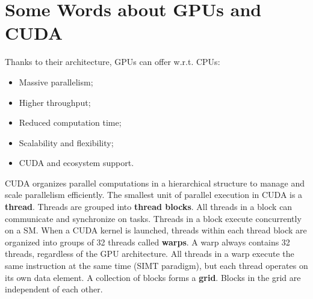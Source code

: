 \documentclass[conference]{IEEEtran}
\begin{document}
	\section{Some Words about GPUs and CUDA}
	Thanks to their architecture, GPUs can offer w.r.t. CPUs\cite{gpu101_lecture1}:
	\begin{itemize}
		\item Massive parallelism;
		\item Higher throughput;
		\item Reduced computation time;
		\item Scalability and flexibility;
		\item CUDA and ecosystem support.
	\end{itemize}
	CUDA organizes parallel computations in a hierarchical structure to manage and scale parallelism efficiently. The smallest unit of parallel execution in CUDA is a \textbf{thread}. Threads are grouped into \textbf{thread blocks}. All threads in a block can communicate and synchronize on tasks. Threads in a block execute 
	concurrently on a SM. When a CUDA kernel is launched, threads within each thread block are organized into groups of 32 threads called \textbf{warps}. A warp always contains 32 threads, regardless of the GPU architecture. All threads in a warp execute the same instruction at the same time (SIMT paradigm), but each thread operates on its own data 
	element. A collection of blocks forms a \textbf{grid}. Blocks in the grid are independent of each other\cite{gpu101_lecture1}.
\end{document}
